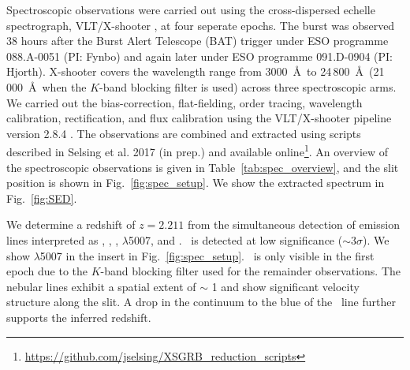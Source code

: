 \documentclass{aa}    %
\begin{document}
Spectroscopic observations were carried out using the cross-dispersed echelle
spectrograph, VLT/X-shooter \citep{Vernet2011}, at four seperate epochs. The
burst was observed 38 hours after the Burst Alert Telescope (BAT) trigger under
ESO programme 088.A-0051 (PI: Fynbo) and again later under ESO programme
091.D-0904 (PI: Hjorth). X-shooter covers the wavelength range from 3000~\AA~to
24\,800~\AA~(21\,000~\AA~when the $K$-band blocking filter is used) across three
spectroscopic arms. We carried out the bias-correction, flat-fielding, order
tracing, wavelength calibration, rectification, and flux calibration using the
VLT/X-shooter pipeline version 2.8.4 \citep{Modigliani2010}.
The observations are combined and extracted using scripts described in Selsing
et al. 2017 (in prep.) and available
online\footnote{\url{https://github.com/jselsing/XSGRB_reduction_scripts}}. 
An overview of the spectroscopic observations is given in
Table~\ref{tab:spec_overview}, and the slit position is shown in
Fig.~\ref{fig:spec_setup}. We show the extracted spectrum in Fig.~\ref{fig:SED}.

We determine a redshift of $z = 2.211$ from the simultaneous detection of
emission lines interpreted as \lya, \oii, \hb, \oiii$\lambda$5007, and \ha. 
\hb~is detected at low significance ($\sim 3 \sigma$). We show \oiii$\lambda$5007
in the insert in Fig.~\ref{fig:spec_setup}.  \ha~is only visible in the first
epoch due to the $K$-band blocking filter used for the remainder observations.
The nebular lines exhibit a spatial extent of $\sim$ 1 and show
significant velocity structure along the slit. A drop in the continuum to the
blue of the \lya~line further supports the inferred redshift.

\end{document}
